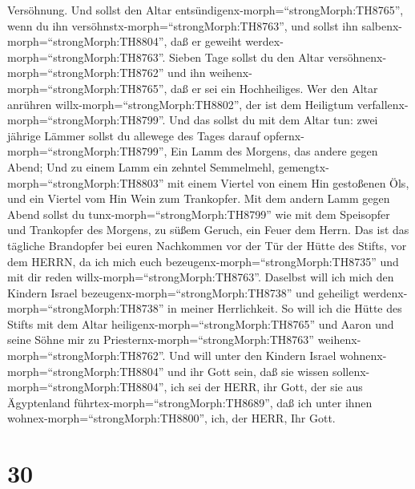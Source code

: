 Versöhnung. Und sollst den Altar
entsündigenx-morph=``strongMorph:TH8765'', wenn du ihn
versöhnstx-morph=``strongMorph:TH8763'', und sollst ihn
salbenx-morph=``strongMorph:TH8804'', daß er geweiht
werdex-morph=``strongMorph:TH8763''.  Sieben Tage sollst du
den Altar versöhnenx-morph=``strongMorph:TH8762'' und ihn
weihenx-morph=``strongMorph:TH8765'', daß er sei ein Hochheiliges. Wer
den Altar anrühren willx-morph=``strongMorph:TH8802'', der ist dem
Heiligtum verfallenx-morph=``strongMorph:TH8799''.  Und das
sollst du mit dem Altar tun: zwei jährige Lämmer sollst du allewege des
Tages darauf opfernx-morph=``strongMorph:TH8799'',  Ein
Lamm des Morgens, das andere gegen Abend;  Und zu einem
Lamm ein zehntel Semmelmehl, gemengtx-morph=``strongMorph:TH8803'' mit
einem Viertel von einem Hin gestoßenen Öls, und ein Viertel vom Hin Wein
zum Trankopfer.  Mit dem andern Lamm gegen Abend sollst du
tunx-morph=``strongMorph:TH8799'' wie mit dem Speisopfer und Trankopfer
des Morgens, zu süßem Geruch, ein Feuer dem Herrn.  Das ist
das tägliche Brandopfer bei euren Nachkommen vor der Tür der Hütte des
Stifts, vor dem HERRN, da ich mich euch
bezeugenx-morph=``strongMorph:TH8735'' und mit dir reden
willx-morph=``strongMorph:TH8763''.  Daselbst will ich mich
den Kindern Israel bezeugenx-morph=``strongMorph:TH8738'' und geheiligt
werdenx-morph=``strongMorph:TH8738'' in meiner Herrlichkeit.
 So will ich die Hütte des Stifts mit dem Altar
heiligenx-morph=``strongMorph:TH8765'' und Aaron und seine Söhne mir zu
Priesternx-morph=``strongMorph:TH8763''
weihenx-morph=``strongMorph:TH8762''.  Und will unter den
Kindern Israel wohnenx-morph=``strongMorph:TH8804'' und ihr Gott sein,
 daß sie wissen sollenx-morph=``strongMorph:TH8804'', ich
sei der HERR, ihr Gott, der sie aus Ägyptenland
führtex-morph=``strongMorph:TH8689'', daß ich unter ihnen
wohnex-morph=``strongMorph:TH8800'', ich, der HERR, Ihr Gott.

\hypertarget{section-29}{%
\section{30}\label{section-29}}


